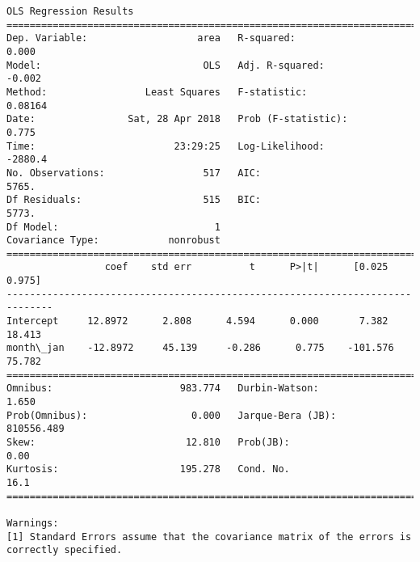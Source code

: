 \documentclass[11pt]{article}
\begin{document}
\begin{Verbatim}[commandchars=\\\{\}]
                            OLS Regression Results                            
==============================================================================
Dep. Variable:                   area   R-squared:                       0.000
Model:                            OLS   Adj. R-squared:                 -0.002
Method:                 Least Squares   F-statistic:                   0.08164
Date:                Sat, 28 Apr 2018   Prob (F-statistic):              0.775
Time:                        23:29:25   Log-Likelihood:                -2880.4
No. Observations:                 517   AIC:                             5765.
Df Residuals:                     515   BIC:                             5773.
Df Model:                           1                                         
Covariance Type:            nonrobust                                         
==============================================================================
                 coef    std err          t      P>|t|      [0.025      0.975]
------------------------------------------------------------------------------
Intercept     12.8972      2.808      4.594      0.000       7.382      18.413
month\_jan    -12.8972     45.139     -0.286      0.775    -101.576      75.782
==============================================================================
Omnibus:                      983.774   Durbin-Watson:                   1.650
Prob(Omnibus):                  0.000   Jarque-Bera (JB):           810556.489
Skew:                          12.810   Prob(JB):                         0.00
Kurtosis:                     195.278   Cond. No.                         16.1
==============================================================================

Warnings:
[1] Standard Errors assume that the covariance matrix of the errors is correctly specified.



\end{Verbatim}
\end{document}

